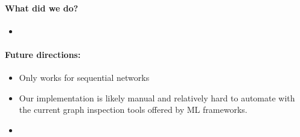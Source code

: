 
\paragraph{What did we do?}

\begin{itemize}
    \item 
\end{itemize}

\paragraph{Future directions:}
\begin{itemize}
\item Only works for sequential networks
\item Our implementation is likely manual and relatively hard to automate with the current graph inspection tools offered by ML frameworks.
\item 
\end{itemize}



